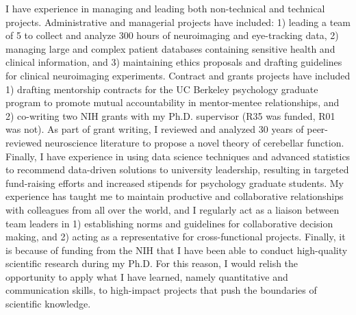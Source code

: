 \documentclass[9pt, a4paper]{maedbh-cv}
\begin{document}
\begin{cvletter}
I have experience in managing and leading both non-technical and technical projects. Administrative and managerial projects have included: 1) leading a team of 5 to collect and analyze 300 hours of neuroimaging and eye-tracking data, 2) managing large and complex patient databases containing sensitive health and clinical information, and 3) maintaining ethics proposals and drafting guidelines for clinical neuroimaging experiments. Contract and grants projects have included 1) drafting mentorship contracts for the UC Berkeley psychology graduate program to promote mutual accountability in mentor-mentee relationships, and 2) co-writing two NIH grants with my Ph.D. supervisor (R35 was funded, R01 was not). As part of grant writing, I reviewed and analyzed 30 years of peer-reviewed neuroscience literature to propose a novel theory of cerebellar function. Finally, I have experience in using data science techniques and advanced statistics to recommend data-driven solutions to university leadership, resulting in targeted fund-raising efforts and increased stipends for psychology graduate students. My experience has taught me to maintain productive and collaborative relationships with colleagues from all over the world, and I regularly act as a liaison between team leaders in 1) establishing norms and guidelines for collaborative decision making, and 2) acting as a representative for cross-functional projects. Finally, it is because of funding from the NIH that I have been able to conduct high-quality scientific research during my Ph.D. For this reason, I would relish the opportunity to apply what I have learned, namely quantitative and communication skills, to high-impact projects that push the boundaries of scientific knowledge. 

\end{cvletter}

\makeletterclosing
\end{document}
